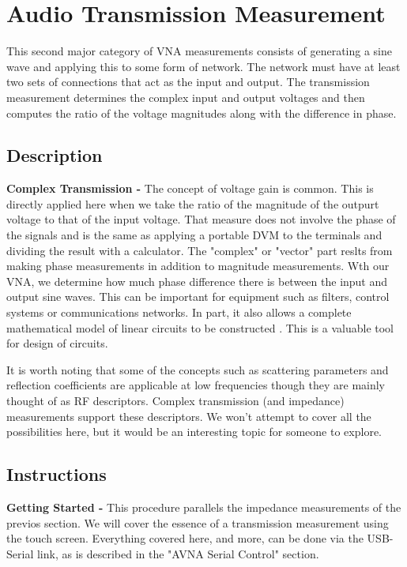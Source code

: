 \section{Audio Transmission Measurement}
This second major category of VNA measurements consists of generating a sine wave and applying this to some form of network.
 The network must have at least two sets of connections that act as the input and output.
The transmission measurement determines the complex input and output voltages and then computes the ratio of the voltage magnitudes along with the difference in phase.
%
\subsection{Description}
\textbf{Complex Transmission - }The concept of voltage gain  is common.
This is directly applied here when we take the ratio of the magnitude of the outpurt voltage to that of the input voltage.
That measure does not involve the phase of the signals and is the same as applying a portable DVM to the terminals and dividing the result with a calculator.
The "complex" or "vector" part reslts from making phase measurements in addition to magnitude measurements.
Wth our VNA, we determine how much phase difference there is between the input and output sine waves.
This can be important for equipment such as  filters, control systems or communications networks.
In part, it also allows a complete mathematical model of linear circuits to be constructed .  This is a valuable tool for design of circuits.

It is worth noting that some of the concepts such as scattering parameters and reflection coefficients are applicable at low frequencies though they are mainly thought of as RF descriptors.  Complex transmission (and impedance) measurements support these descriptors.  We won't attempt to cover all the possibilities here, but it would be an interesting topic for someone to explore.


\subsection{Instructions}
\textbf{Getting Started - }This procedure parallels the impedance measurements of the previos section.
We will cover the essence of a transmission measurement using the touch screen.
Everything covered here, and more, can be done via the USB-Serial link, as is described in the "AVNA Serial Control" section.

